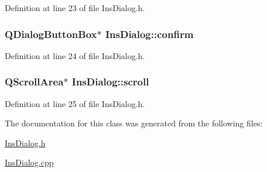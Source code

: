 Definition at line 23 of file Ins\+Dialog.\+h.

\hypertarget{class_ins_dialog_aa77dfa096f7cd3bc82823f6944ecbd8b}{
\subsubsection[{confirm}]{\setlength{\rightskip}{0pt plus 5cm}Q\+Dialog\+Button\+Box$\ast$ Ins\+Dialog\+::confirm\hspace{0.3cm}{\ttfamily [private]}}}\label{class_ins_dialog_aa77dfa096f7cd3bc82823f6944ecbd8b}


Definition at line 24 of file Ins\+Dialog.\+h.

\hypertarget{class_ins_dialog_a822e0887cf9597f75ed5c4a772a8c9db}{
\subsubsection[{scroll}]{\setlength{\rightskip}{0pt plus 5cm}Q\+Scroll\+Area$\ast$ Ins\+Dialog\+::scroll\hspace{0.3cm}{\ttfamily [private]}}}\label{class_ins_dialog_a822e0887cf9597f75ed5c4a772a8c9db}


Definition at line 25 of file Ins\+Dialog.\+h.



The documentation for this class was generated from the following files\+:\begin{DoxyCompactItemize}
\item 
\hyperlink{_ins_dialog_8h}{Ins\+Dialog.\+h}\item 
\hyperlink{_ins_dialog_8cpp}{Ins\+Dialog.\+cpp}\end{DoxyCompactItemize}
